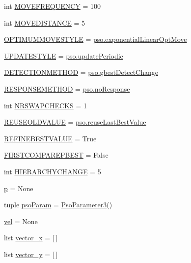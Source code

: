 \begin{CompactItemize}
\item 
int \hyperlink{namespacepsostart_b2a0815fb64577d432f816c6cd0f9178}{MOVEFREQUENCY} = 100
\item 
int \hyperlink{namespacepsostart_509e6c062fe0b5ac8f25398216e67f89}{MOVEDISTANCE} = 5
\item 
\hyperlink{namespacepsostart_1580bebace469bf87b3e2c861e983cbc}{OPTIMUMMOVESTYLE} = \hyperlink{namespacepso_45a31f10e8595a3d9ac89f76b52886e5}{pso.exponentialLinearOptMove}
\item 
\hyperlink{namespacepsostart_4c6c05045fa85150949a9e5ebfa9615b}{UPDATESTYLE} = \hyperlink{namespacepso_8f17d13a72a14e5dcca6538e168f02ba}{pso.updatePeriodic}
\item 
\hyperlink{namespacepsostart_39c48e09a2e1c40cae381743eef64319}{DETECTIONMETHOD} = \hyperlink{namespacepso_f18f59b20d4081e64b956a3c8f29105e}{pso.gbestDetectChange}
\item 
\hyperlink{namespacepsostart_769be171b1c94fde02394d2a4efe160f}{RESPONSEMETHOD} = \hyperlink{namespacepso_58d899f781247c69ee071e1117ded9b2}{pso.noResponse}
\item 
int \hyperlink{namespacepsostart_6c58ebff0b415a15377d7bce5d77f1a2}{NRSWAPCHECKS} = 1
\item 
\hyperlink{namespacepsostart_ef42863a90b026064acb46a439ad66a4}{REUSEOLDVALUE} = \hyperlink{namespacepso_72127295dfa004794c965c42900116d2}{pso.reuseLastBestValue}
\item 
\hyperlink{namespacepsostart_0683581f443a1833094be4af9bfa53fc}{REFINEBESTVALUE} = True
\item 
\hyperlink{namespacepsostart_652fecc2783c6751fe8ea9ef83805747}{FIRSTCOMPAREPBEST} = False
\item 
int \hyperlink{namespacepsostart_869ea53446100d3296786868d2c17965}{HIERARCHYCHANGE} = 5
\item 
\hyperlink{namespacepsostart_212b7e52d588d863bbc6b9f2dc1a302a}{p} = None
\item 
tuple \hyperlink{namespacepsostart_38617951b9c3a3f6bc520f849c3daa46}{psoParam} = \hyperlink{classpsoParameter_1_1PsoParameter3}{PsoParameter3}()
\item 
\hyperlink{namespacepsostart_c9e1e4f950b30610115554fde9b24315}{vel} = None
\item 
list \hyperlink{namespacepsostart_ce591784a486a55bff5e9eefe6143db8}{vector\_\-x} = \mbox{[}$\,$\mbox{]}
\item 
list \hyperlink{namespacepsostart_804613fe2ccb90fc68ae55454b45086e}{vector\_\-y} = \mbox{[}$\,$\mbox{]}
\item 

\end{CompactItemize}
